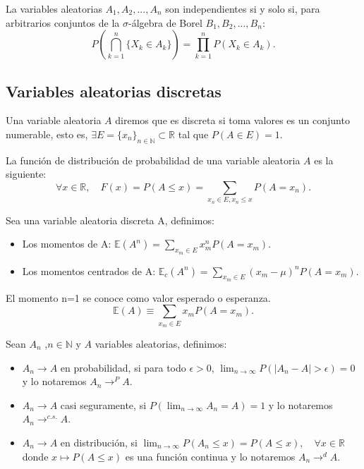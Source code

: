 \documentclass[../proyecto.tex]{memoir}
\begin{document}
\begin{defi}
La variables aleatorias $A_1, A_2,..., A_n$ son independientes si y solo si, para arbitrarios conjuntos de la $\sigma$-álgebra de Borel $B_1, B_2,..., B_n$: $$
	P \left( \bigcap_{k = 1}^{n} \{X_k \in A_k\} \right) = \prod_{k = 1}^{n} P(X_k \in A_k).
$$
\end{defi}

\subsection{Variables aleatorias discretas}

\begin{defi}
Una variable aleatoria $A$ diremos que es discreta si toma valores es un conjunto numerable, esto es, $\exists E=\{x_n\}_{n \in \mathds{N}} \subset \mathds{R}$ tal que $P(A \in E)=1$. 
\end{defi}

\begin{defi}
La función de distribución de probabilidad de una variable aleatoria $A$ es la siguiente: $$
\forall x\in \mathds{R}, \quad F(x) = P( A \leq x) = \sum_{x_n\in E, x_n \leq x} P(A=x_n).
$$
\end{defi}

\begin{defi}
Sea una variable aleatoria discreta A, definimos:

\begin{itemize}
\item Los momentos de A: $\mathds{E}(A^n) = \sum_{x_m \in E} x_m^n P(A=x_m)$.
\item Los momentos centrados de A: $\mathds{E}_c(A^n) =\sum_{x_m \in E} (x_m - \mu)^n P(A=x_m)$.
\end{itemize}
\end{defi}

El momento n=1 se conoce como valor esperado o esperanza. $$
\mathds{E}(A) \equiv \sum_{x_m \in E} x_m P(A=x_m).
$$

\begin{defi}
Sean ${A_n}$ ,$n\in \mathds{N}$ y $A$ variables aleatorias, definimos:
\begin{itemize}
\item $A_n \to A$ en probabilidad, si para todo $\epsilon > 0$, $\lim_{n\to\infty} P( |A_n-A|> \epsilon ) = 0$ y lo notaremos $A_n \to^{P} A$.
\item $A_n \to A$ casi seguramente, si $P(\lim_{n\to\infty} A_n=A) = 1$ y lo notaremos $A_n \to^{c.s.} A$.
\item $A_n \to A$ en distribución, si $\lim_{n \to \infty} P(A_n \leq x) = P(A \leq x),\quad \forall x \in \mathds{R}$ donde $x\mapsto P(A \leq x)$ es una función continua y lo notaremos $A_n \to^{d} A$.
\end{itemize}
\end{defi}
\end{document}
